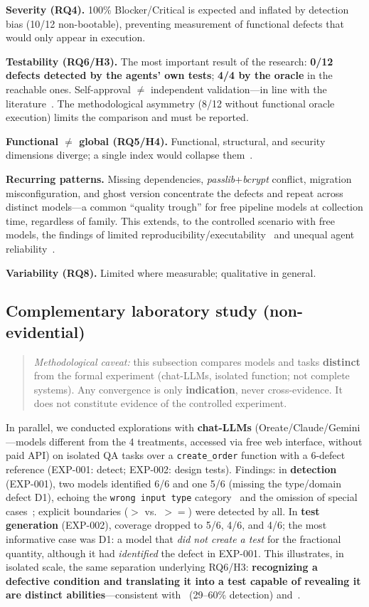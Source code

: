 \documentclass[11pt]{article}
\begin{document}
\textbf{Severity (RQ4).} 100\% Blocker/Critical is expected and inflated by detection bias (10/12 non-bootable), preventing measurement of functional defects that would only appear in execution.

\textbf{Testability (RQ6/H3).} The most important result of the research: \textbf{0/12 defects detected by the agents' own tests}; \textbf{4/4 by the oracle} in the reachable ones. Self-approval $\neq$ independent validation---in line with the literature~\cite{C03,C04,C05,C06}. The methodological asymmetry (8/12 without functional oracle execution) limits the comparison and must be reported.

\textbf{Functional $\neq$ global (RQ5/H4).} Functional, structural, and security dimensions diverge; a single index would collapse them~\cite{D04}.

\textbf{Recurring patterns.} Missing dependencies, \textit{passlib}+\textit{bcrypt} conflict, migration misconfiguration, and ghost version concentrate the defects and repeat across distinct models---a common ``quality trough'' for free pipeline models at collection time, regardless of family. This extends, to the controlled scenario with free models, the findings of limited reproducibility/executability~\cite{F02} and unequal agent reliability~\cite{F05}.

\textbf{Variability (RQ8).} Limited where measurable; qualitative in general.

\subsection{Complementary laboratory study (non-evidential)}

\begin{quote}
\emph{Methodological caveat:} this subsection compares models and tasks \textbf{distinct} from the formal experiment (chat-LLMs, isolated function; not complete systems). Any convergence is only \textbf{indication}, never cross-evidence. It does not constitute evidence of the controlled experiment.
\end{quote}

In parallel, we conducted explorations with \textbf{chat-LLMs} (Oreate/Claude/Gemini---models different from the 4 treatments, accessed via free web interface, without paid API) on isolated QA tasks over a \texttt{create\_order} function with a 6-defect reference (EXP-001: detect; EXP-002: design tests). Findings: in \textbf{detection} (EXP-001), two models identified 6/6 and one 5/6 (missing the type/domain defect D1), echoing the \texttt{wrong input type} category~\cite{B01} and the omission of special cases~\cite{C06}; explicit boundaries ($>$ vs.\ $>=$) were detected by all. In \textbf{test generation} (EXP-002), coverage dropped to 5/6, 4/6, and 4/6; the most informative case was D1: a model that \emph{did not create a test} for the fractional quantity, although it had \emph{identified} the defect in EXP-001. This illustrates, in isolated scale, the same separation underlying RQ6/H3: \textbf{recognizing a defective condition and translating it into a test capable of revealing it are distinct abilities}---consistent with~\cite{C04} (29--60\% detection) and~\cite{C03}.
\end{document}
